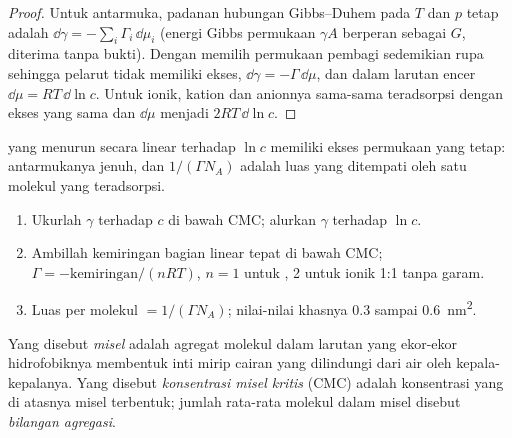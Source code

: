 \begin{proof}
Untuk antarmuka, padanan hubungan Gibbs--Duhem pada $T$ dan
$p$ tetap adalah $\dd\gamma = -\sum_i\Gamma_i\,\dd\mu_i$ (energi Gibbs permukaan $\gamma A$ berperan sebagai $G$,
diterima tanpa bukti). Dengan memilih permukaan pembagi sedemikian rupa sehingga pelarut tidak memiliki ekses,
$\dd\gamma = -\Gamma\,\dd\mu$, dan dalam larutan encer $\dd\mu = RT\,\dd\ln c$. Untuk  ionik,
kation dan anionnya sama-sama teradsorpsi dengan ekses yang sama dan $\dd\mu$ menjadi
$2RT\,\dd\ln c$.
\end{proof}

 yang  menurun secara linear terhadap $\ln c$ memiliki ekses
permukaan yang tetap: antarmukanya jenuh, dan $1/(\Gamma N_A)$ adalah luas yang ditempati oleh
satu molekul yang teradsorpsi.

\begin{method}\label{met:b3:colloids:surface-excess}
\begin{enumerate}
  \item Ukurlah $\gamma$ terhadap $c$ di bawah CMC; alurkan $\gamma$ terhadap $\ln c$.
  \item Ambillah kemiringan bagian linear tepat di bawah CMC; $\Gamma = -\text{kemiringan}/(nRT)$, $n
        = 1$ untuk , 2 untuk  ionik 1:1 tanpa garam.
  \item Luas per molekul $= 1/(\Gamma N_A)$; nilai-nilai khasnya 0.3 sampai \qty{0.6}{nm^2}.
\end{enumerate}
\end{method}

\begin{definition}\label{def:b3:colloids:micelle}
Yang disebut \emph{misel} adalah agregat molekul  dalam larutan
yang ekor-ekor hidrofobiknya membentuk inti mirip cairan yang dilindungi dari air oleh
kepala-kepalanya. Yang disebut \emph{konsentrasi misel kritis}
(CMC) adalah konsentrasi yang di atasnya misel terbentuk; jumlah
rata-rata molekul dalam misel disebut \emph{bilangan agregasi}.
\end{definition}

